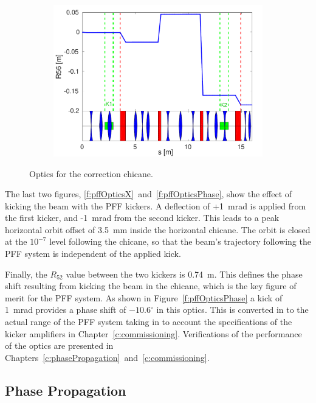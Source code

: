 \documentclass[%
 reprint,
 superscriptaddress,
 amsmath,
 amssymb,
 prstab,
]{revtex4-1}
\begin{document}
\begin{figure}
	\begin{subfigure}{\columnwidth}
		\includegraphics[width=\textwidth]{figs/optics/pffOpticsR56_chicane}
		\caption{}
		\label{f:pffOpticsR56_chicane}
	\end{subfigure}

	\caption{\label{f:opticsPlots}Optics for the correction chicane.}

\end{figure}

The last two figures, \ref{f:pffOpticsX}~and~\ref{f:pffOpticsPhase}, show the 
effect of kicking the beam with the PFF kickers. A deflection of +1~mrad is 
applied from the first kicker, and -1~mrad from the second kicker. This leads 
to a peak horizontal orbit offset of 3.5~mm inside the horizontal chicane. The 
orbit is closed at the \(10^{-7}\) level following the chicane, so that the 
beam's trajectory following the PFF system is independent of the applied kick. 

Finally, the \(R_{52}\) value between the two kickers is 0.74~m. This defines 
the phase shift resulting from kicking the beam in the chicane, which is the 
key figure of merit for the PFF system. As shown in 
Figure~\ref{f:pffOpticsPhase} a kick of 1~mrad provides a phase shift of 
\(-10.6^\circ\) in this optics. This is converted in to the actual range of the 
PFF system taking in to account the specifications of the kicker amplifiers in 
Chapter~\ref{c:commissioning}. Verifications of the performance of the optics 
are presented in Chapters~\ref{c:phasePropagation}~and~\ref{c:commissioning}.

\subsection{\label{ss:prop}Phase Propagation}
\end{document}
